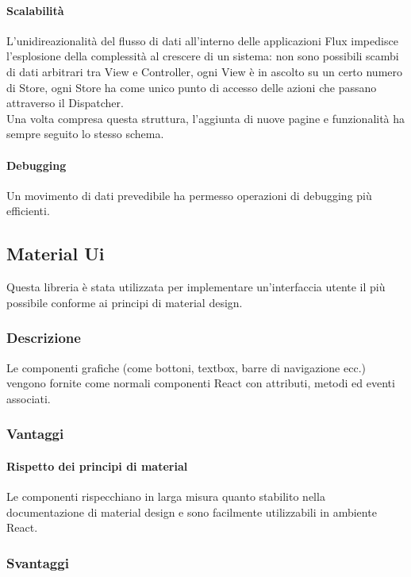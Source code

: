 \paragraph{Scalabilità}
L'unidireazionalità del flusso di dati all'interno delle applicazioni Flux impedisce
l'esplosione della complessità al crescere di un sistema: non sono possibili scambi di
dati arbitrari tra View e Controller, ogni View è in ascolto su un certo numero di Store,
ogni Store ha come unico punto di accesso delle azioni che passano attraverso il Dispatcher. \\

Una volta compresa questa struttura, l'aggiunta di nuove pagine e funzionalità
ha sempre seguito lo stesso schema.

\paragraph{Debugging}
Un movimento di dati prevedibile ha permesso operazioni di debugging più efficienti.

\subsection{Material Ui}\label{material-ui}

Questa libreria è stata utilizzata per implementare un'interfaccia utente il più
possibile conforme ai principi di material design.

\subsubsection{Descrizione}
Le componenti grafiche (come bottoni, textbox, barre di navigazione ecc.) vengono
fornite come normali componenti React con attributi, metodi ed eventi associati.

\subsubsection{Vantaggi}

\paragraph{Rispetto dei principi di material}
Le componenti rispecchiano in larga
misura quanto stabilito nella documentazione di material design e sono facilmente 
utilizzabili in ambiente React.

\subsubsection{Svantaggi}

